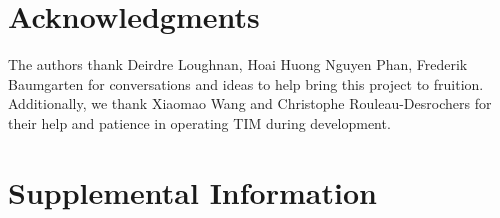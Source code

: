 \documentclass[a4paper,12pt]{article}
\begin{document}

\section{Acknowledgments}
The authors thank Deirdre Loughnan, Hoai Huong Nguyen Phan, Frederik Baumgarten for conversations and ideas to help bring this project to fruition. Additionally, we thank Xiaomao Wang and Christophe Rouleau-Desrochers for their help and patience in operating TIM during development. 

\section{Supplemental Information}
\end{document}
